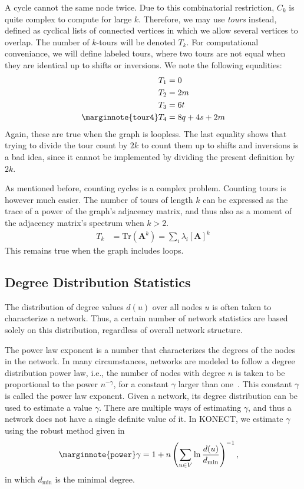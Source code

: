 \documentclass{article}
\begin{document}
A cycle cannot the same node twice.  Due to this combinatorial
restriction, $C_k$ is quite complex to compute for large $k$.
Therefore, we may use \emph{tours} instead, defined as cyclical lists of
connected vertices in which we allow several vertices to overlap.  The
number of $k$-tours will be denoted $T_k$.  For computational
conveniance, we will define labeled tours, where two tours are not equal
when they are identical up to shifts or inversions.  
We note the following equalities: 
\begin{align}
  T_1 &= 0 \nonumber \\
  T_2 &= 2m \nonumber \\
  T_3 &= 6t \nonumber \\
  \marginnote{\texttt{tour4}}
  T_4 &= 8q + 4s + 2m 
\end{align}
Again, these are true when the graph is loopless.  The last equality
shows that trying to divide the tour count by $2k$ to count them up to
shifts and inversions is a bad idea, since it cannot be implemented by
dividing the present definition by $2k$. 

As mentioned before, counting cycles is a complex problem.  Counting
tours is however much easier.  The number of tours of length $k$ can be
expressed as the trace of a power of the graph's adjacency matrix, and
thus also as a moment of the adjacency matrix's spectrum when $k > 2$.  
\begin{align*}
  T_k &= \mathrm{Tr}(\mathbf A^k) = \sum_i \lambda_i[\mathbf A]^k
\end{align*}
This remains true when the graph includes loops.  

\subsection{Degree Distribution Statistics}
The distribution of degree values $d(u)$ over all nodes $u$ is often
taken to characterize a network.  Thus, a certain number of network
statistics are based solely on this distribution, regardless of overall
network structure.

The power law exponent is a number that characterizes the degrees of the
nodes in the network.  In many circumstances, networks are modeled to
follow a degree distribution power law, i.e., the number of nodes with
degree $n$ is taken to be proportional to the power $n^{-\gamma}$, for a
constant $\gamma$ larger than one~\cite{b439}.  This constant $\gamma$
is called the power law exponent.  Given a network, its degree
distribution can be used to estimate a value $\gamma$.  There are
multiple ways of estimating $\gamma$, and thus a network does not have a
single definite value of it. In KONECT, we estimate $\gamma$ using the
robust method given in \cite[Eq.~5]{b408}
\begin{align}
  \marginnote{\texttt{power}} \gamma &= 1 + n \left( \sum_{u\in V} \ln
  \frac {d(u)} {d_{\min}} \right) ^{-1},
\end{align}
in which $d_{\min}$ is the minimal degree.
\end{document}
